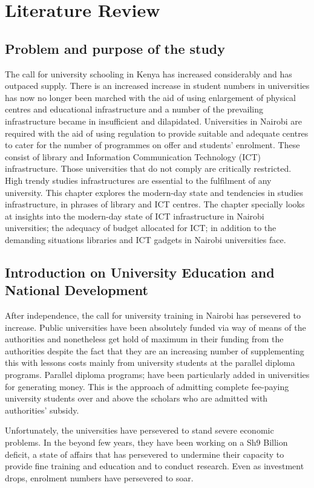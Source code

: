 \chapter{\huge{\textbf{Literature Review }}}

\section{\textbf{Problem and purpose of the study}}
The call for university schooling in Kenya has increased considerably and has outpaced supply. There is an increased increase in student numbers in universities has now no longer been marched with the aid of using enlargement of physical centres and educational infrastructure and a number of the prevailing infrastructure became in insufficient and dilapidated. Universities in Nairobi are required with the aid of using regulation to provide suitable and adequate centres to cater for the number of programmes on offer and students’ enrolment. These consist of library and Information Communication Technology (ICT) infrastructure. Those universities that do not comply are critically restricted.  High trendy studies infrastructures are essential to the fulfilment of any university. This chapter explores the modern-day state and tendencies in studies infrastructure, in phrases of library and ICT centres. The chapter specially looks at insights into the modern-day state of ICT infrastructure in Nairobi universities; the adequacy of budget allocated for ICT; in addition to the demanding situations libraries and ICT gadgets in Nairobi universities face.

\section{\textbf{Introduction on University Education and National Development}}
After independence, the call for university training in Nairobi has persevered to increase. Public universities have been absolutely funded via way of means of the authorities and nonetheless get hold of maximum in their funding from the authorities despite the fact that they are an increasing number of supplementing this with lessons costs mainly from university students at the parallel diploma programs. Parallel diploma programs; have been particularly added in universities for generating money. This is the approach of admitting complete fee-paying university students over and above the scholars who are admitted with authorities’ subsidy.

Unfortunately, the universities have persevered to stand severe economic problems. In the beyond few years, they have been working on a Sh9 Billion deficit, a state of affairs that has persevered to undermine their capacity to provide fine training and education and to conduct research. Even as investment drops, enrolment numbers have persevered to soar.

